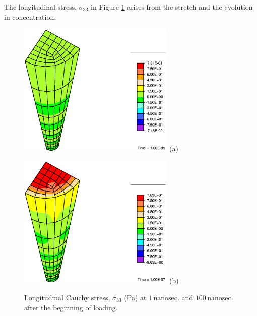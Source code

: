 The longitudinal stress, $\sigma_{33}$ in Figure \ref{stressfig}
arises from the stretch and the evolution in concentration.
\begin{figure}[ht]
\begin{minipage}[t]{7.5cm}
{\includegraphics[width=7.5cm]{images/S33-1.eps}} \hskip 3cm (a)
\end{minipage}
\begin{minipage}[t]{7.5cm}
{\includegraphics[width=7.5cm]{images/S33-100.eps}} \hskip 3cm (b)
\end{minipage}
\caption{Longitudinal Cauchy stress, $\sigma_{33}$ (Pa) at $1
\,\mathrm{nanosec.}$ and $100\,\mathrm{nanosec.}$ after the
beginning of loading.} \label{stressfig}
\end{figure}


